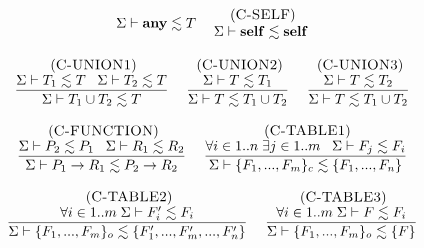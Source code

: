 \begin{figure}[!ht]
\begin{footnotesize}
$$\begin{array}{c}
\begin{array}{c}
\senv \vdash \Any \lesssim T
\end{array}
\;
\begin{array}{c}
\mylabel{C-SELF}\\
\senv \vdash \Self \lesssim \Self
\end{array}
\\ \\
\begin{array}{c}
\mylabel{C-UNION1}\\
\dfrac{\senv \vdash T_{1} \lesssim T \;\;\;
       \senv \vdash T_{2} \lesssim T}
      {\senv \vdash T_{1} \cup T_{2} \lesssim T}
\end{array}
\;
\begin{array}{c}
\mylabel{C-UNION2}\\
\dfrac{\senv \vdash T \lesssim T_{1}}
      {\senv \vdash T \lesssim T_{1} \cup T_{2}}
\end{array}
\;
\begin{array}{c}
\mylabel{C-UNION3}\\
\dfrac{\senv \vdash T \lesssim T_{2}}
      {\senv \vdash T \lesssim T_{1} \cup T_{2}}
\end{array}
\\ \\
\begin{array}{c}
\mylabel{C-FUNCTION}\\
\dfrac{\senv \vdash P_{2} \lesssim P_{1} \;\;\;
       \senv \vdash R_{1} \lesssim R_{2}}
      {\senv \vdash P_{1} \rightarrow R_{1} \lesssim P_{2} \rightarrow R_{2}}
\end{array}
\;
\begin{array}{c}
\mylabel{C-TABLE1}\\
\dfrac{\forall i \in 1..n \; \exists j \in 1..m \;\;\;
       \senv \vdash F_{j} \lesssim F_{i}}
      {\senv \vdash \{F_{1}, ..., F_{m}\}_{c} \lesssim \{F_{1}, ..., F_{n}\}}
\end{array}
\\ \\
\begin{array}{c}
\mylabel{C-TABLE2}\\
\dfrac{\forall i \in 1..m \; \senv \vdash F_{i}' \lesssim F_{i}}
      {\senv \vdash \{F_{1}, ..., F_{m}\}_{o} \lesssim \{F_{1}', ..., F_{m}', ..., F_{n}'\}}
\end{array}
\;
\begin{array}{c}
\mylabel{C-TABLE3}\\
\dfrac{\forall i \in 1..m \; \senv \vdash F \lesssim F_{i}}
      {\senv \vdash \{F_{1}, ..., F_{m}\}_{o} \lesssim \{F\}} 

\end{array}
\end{array}$$
\end{footnotesize}
\end{figure}
